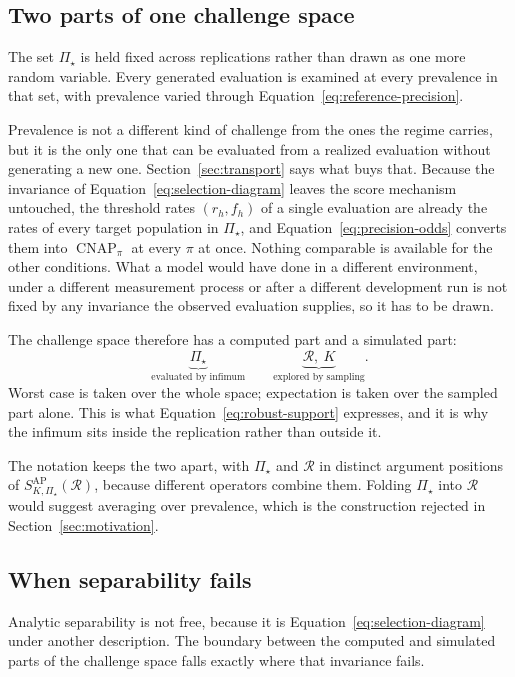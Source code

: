 \documentclass[11pt]{article}
\newcommand{\CNAP}{\operatorname{CNAP}}
\newcommand{\Regime}{\mathcal{R}}
\newcommand{\PSet}{\Pi_\star}
\theoremstyle{remark}
\begin{document}
\subsection{Two parts of one challenge space}
\label{sec:challenge-space}

The set $\PSet$ is held fixed across replications rather than drawn as one more random variable. Every generated evaluation is examined at every prevalence in that set, with prevalence varied through Equation~\eqref{eq:reference-precision}.

Prevalence is not a different kind of challenge from the ones the regime carries, but it is the only one that can be evaluated from a realized evaluation without generating a new one. Section~\ref{sec:transport} says what buys that. Because the invariance of Equation~\eqref{eq:selection-diagram} leaves the score mechanism untouched, the threshold rates $(r_h,f_h)$ of a single evaluation are already the rates of every target population in $\PSet$, and Equation~\eqref{eq:precision-odds} converts them into $\CNAP_\pi$ at every $\pi$ at once. Nothing comparable is available for the other conditions. What a model would have done in a different environment, under a different measurement process or after a different development run is not fixed by any invariance the observed evaluation supplies, so it has to be drawn.

The challenge space therefore has a computed part and a simulated part:
\[
\underbrace{\PSet}_{\text{evaluated by infimum}}
\qquad
\underbrace{\Regime,\ K}_{\text{explored by sampling}}.
\]
Worst case is taken over the whole space; expectation is taken over the sampled part alone. This is what Equation~\eqref{eq:robust-support} expresses, and it is why the infimum sits inside the replication rather than outside it.

The notation keeps the two apart, with $\PSet$ and $\Regime$ in distinct argument positions of $S_{K,\PSet}^{\mathrm{AP}}(\Regime)$, because different operators combine them. Folding $\PSet$ into $\Regime$ would suggest averaging over prevalence, which is the construction rejected in Section~\ref{sec:motivation}.

\subsection{When separability fails}
\label{sec:separability}

Analytic separability is not free, because it is Equation~\eqref{eq:selection-diagram} under another description. The boundary between the computed and simulated parts of the challenge space falls exactly where that invariance fails.
\end{document}
